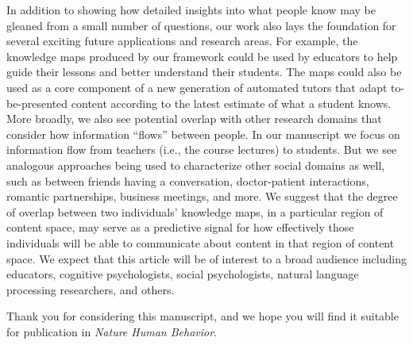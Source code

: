 \documentclass[11pt,stdletter,orderfromtodate,sigleft]{newlfm}
\newcommand{\journal}{Nature Human Behavior}
\begin{document}
\begin{newlfm}
In addition to showing how detailed insights into what people know may be
gleaned from a small number of questions, our work also lays the foundation for
several exciting future applications and research areas. For example, the
knowledge maps produced by our framework could be used by educators to help
guide their lessons and better understand their students. The maps could also
be used as a core component of a new generation of automated tutors that adapt
to-be-presented content according to the latest estimate of what a student
knows. More broadly, we also see potential overlap with other research domains
that consider how information ``flows'' between people. In our manuscript we
focus on information flow from teachers (i.e., the course lectures) to
students. But we see analogous approaches being used to characterize other
social domains as well, such as between friends having a conversation,
doctor-patient interactions, romantic partnerships, business meetings, and
more. We suggest that the degree of overlap between two individuals' knowledge
maps, in a particular region of content space, may serve as a predictive signal
for how effectively those individuals will be able to communicate about content
in that region of content space. We expect that this article will be of
interest to a broad audience including educators, cognitive psychologists,
social psychologists, natural language processing researchers, and others.

Thank you for considering this manuscript, and we hope you will find it suitable
for publication in \textit{\journal}.


\end{newlfm}
\end{document}
